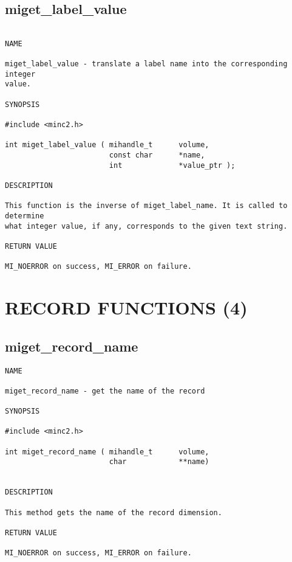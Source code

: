 \documentclass{article}
\begin{document}
\subsection{miget\_label\_value}
\begin{verbatim}

NAME

miget_label_value - translate a label name into the corresponding integer
value.

SYNOPSIS

#include <minc2.h>

int miget_label_value ( mihandle_t      volume, 
                        const char      *name, 
                        int             *value_ptr );

DESCRIPTION

This function is the inverse of miget_label_name. It is called to determine
what integer value, if any, corresponds to the given text string.

RETURN VALUE

MI_NOERROR on success, MI_ERROR on failure.
\end{verbatim}

\section{RECORD FUNCTIONS (4)}
\subsection{miget\_record\_name}
\begin{verbatim}
NAME

miget_record_name - get the name of the record

SYNOPSIS

#include <minc2.h>

int miget_record_name ( mihandle_t      volume,
                        char            **name)


DESCRIPTION

This method gets the name of the record dimension.

RETURN VALUE

MI_NOERROR on success, MI_ERROR on failure.
\end{verbatim}
\end{document}
